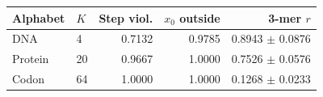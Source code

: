 \begin{tabular}{llrrr}
\toprule
Alphabet & $K$ & Step viol. & $x_0$ outside & 3-mer $r$ \\
\midrule
DNA & 4 & 0.7132 & 0.9785 & 0.8943 $\pm$ 0.0876 \\
Protein & 20 & 0.9667 & 1.0000 & 0.7526 $\pm$ 0.0576 \\
Codon & 64 & 1.0000 & 1.0000 & 0.1268 $\pm$ 0.0233 \\
\bottomrule
\end{tabular}
